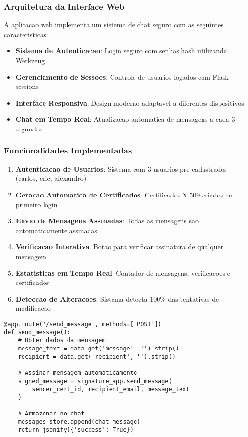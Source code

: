 \documentclass[12pt,a4paper,oneside]{article}
\begin{document}
\subsubsection{Arquitetura da Interface Web}

A aplicacao web implementa um sistema de chat seguro com as seguintes caracteristicas:

\begin{itemize}
    \item \textbf{Sistema de Autenticacao}: Login seguro com senhas hash utilizando Werkzeug
    \item \textbf{Gerenciamento de Sessoes}: Controle de usuarios logados com Flask sessions
    \item \textbf{Interface Responsiva}: Design moderno adaptavel a diferentes dispositivos
    \item \textbf{Chat em Tempo Real}: Atualizacao automatica de mensagens a cada 3 segundos
\end{itemize}

\subsubsection{Funcionalidades Implementadas}

\begin{enumerate}
    \item \textbf{Autenticacao de Usuarios}: Sistema com 3 usuarios pre-cadastrados (carlos, eric, alexandro)
    \item \textbf{Geracao Automatica de Certificados}: Certificados X.509 criados no primeiro login
    \item \textbf{Envio de Mensagens Assinadas}: Todas as mensagens sao automaticamente assinadas
    \item \textbf{Verificacao Interativa}: Botao para verificar assinatura de qualquer mensagem
    \item \textbf{Estatisticas em Tempo Real}: Contador de mensagens, verificacoes e certificados
    \item \textbf{Deteccao de Alteracoes}: Sistema detecta 100\% das tentativas de modificacao
\end{enumerate}

\begin{lstlisting}[caption=Estrutura da aplicacao Flask]
@app.route('/send_message', methods=['POST'])
def send_message():
    # Obter dados da mensagem
    message_text = data.get('message', '').strip()
    recipient = data.get('recipient', '').strip()
    
    # Assinar mensagem automaticamente
    signed_message = signature_app.send_message(
        sender_cert_id, recipient_email, message_text
    )
    
    # Armazenar no chat
    messages_store.append(chat_message)
    return jsonify({'success': True})
\end{lstlisting}
\end{document}
